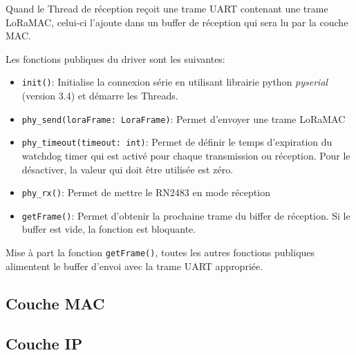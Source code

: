     Quand le Thread de réception reçoit une trame UART contenant une trame LoRaMAC, celui-ci l'ajoute dans un buffer de réception qui sera lu par la couche MAC.

    Les fonctions publiques du driver sont les suivantes:
    \begin{itemize}
        \item \texttt{init()}: Initialise la connexion série en utilisant librairie python \textit{pyserial} (version 3.4) et démarre les Threads.
        \item \texttt{phy\_send(loraFrame: LoraFrame)}: Permet d'envoyer une trame LoRaMAC
        \item \texttt{phy\_timeout(timeout: int)}: Permet de définir le temps d'expiration du watchdog timer qui est activé pour chaque transmission ou réception. Pour le désactiver, la valeur qui doit être utilisée est zéro.
        \item \texttt{phy\_rx()}: Permet de mettre le RN2483 en mode réception
        \item \texttt{getFrame()}: Permet d'obtenir la prochaine trame du biffer de réception. Si le buffer est vide, la fonction est bloquante.
    \end{itemize}

    Mise à part la fonction \texttt{getFrame()}, toutes les autres fonctions publiques alimentent le buffer d'envoi avec la trame UART appropriée.

\subsection*{Couche MAC}

\subsection*{Couche IP}\label{subsec:work-loraroot:iplayer}